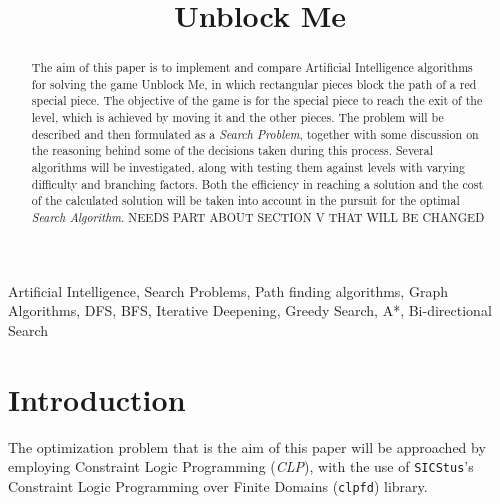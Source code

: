 \documentclass[conference]{IEEEtran}
\begin{document}
\title{Unblock Me}

\author{
\and
{}
\and
{}
}

\maketitle

\begin{abstract}
The aim of this paper is to implement and compare Artificial Intelligence algorithms for solving the game Unblock Me, in which rectangular pieces block the path of a red special piece. The objective of the game is for the special piece to reach the exit of the level, which is achieved by moving it and the other pieces.
The problem will be described and then formulated as a \textit{Search Problem}, together with some discussion on the reasoning behind some of the decisions taken during this process.
Several algorithms will be investigated, along with testing them against levels with varying difficulty and branching factors. Both the efficiency in reaching a solution and the cost of the calculated solution will be taken into account in the pursuit for the optimal \textit{Search Algorithm}.
{\huge NEEDS PART ABOUT SECTION V THAT WILL BE CHANGED}

\end{abstract}

\begin{IEEEkeywords}
Artificial Intelligence, Search Problems, Path finding algorithms, Graph Algorithms, DFS, BFS, Iterative Deepening, Greedy Search, A*, Bi-directional Search
\end{IEEEkeywords}

\section{Introduction}
The optimization problem that is the aim of this paper will be approached by employing Constraint Logic Programming (\textit{CLP}), with the use of \verb;SICStus;'s Constraint Logic Programming over Finite Domains (\verb;clpfd;) library.
\end{document}
